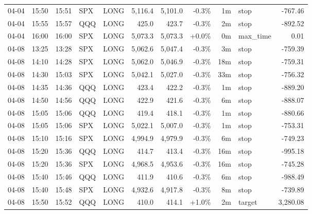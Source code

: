 \documentclass[11pt,a4paper,twoside]{article}
\begin{document}
\begin{center}
\begin{longtable}{>{\color{txtmain}}l l l l l r r r r >{\color{txtmain}}l r}
04-04 & 15:50 & 15:51 & SPX & LONG & 5,116.4 & 5,101.0 & \textcolor{lossred}{-0.3\%} & 1m & stop & \textcolor{lossred}{-767.46} \\
04-04 & 15:55 & 15:57 & QQQ & LONG & 425.0 & 423.7 & \textcolor{lossred}{-0.3\%} & 2m & stop & \textcolor{lossred}{-892.52} \\
04-04 & 16:00 & 16:00 & SPX & LONG & 5,073.3 & 5,073.3 & \textcolor{wingreen}{+0.0\%} & 0m & max\_time & \textcolor{wingreen}{0.01} \\
04-08 & 13:25 & 13:28 & SPX & LONG & 5,062.6 & 5,047.4 & \textcolor{lossred}{-0.3\%} & 3m & stop & \textcolor{lossred}{-759.39} \\
04-08 & 14:10 & 14:28 & SPX & LONG & 5,062.0 & 5,046.9 & \textcolor{lossred}{-0.3\%} & 18m & stop & \textcolor{lossred}{-759.31} \\
04-08 & 14:30 & 15:03 & SPX & LONG & 5,042.1 & 5,027.0 & \textcolor{lossred}{-0.3\%} & 33m & stop & \textcolor{lossred}{-756.32} \\
04-08 & 14:35 & 14:36 & QQQ & LONG & 423.4 & 422.2 & \textcolor{lossred}{-0.3\%} & 1m & stop & \textcolor{lossred}{-889.20} \\
04-08 & 14:50 & 14:56 & QQQ & LONG & 422.9 & 421.6 & \textcolor{lossred}{-0.3\%} & 6m & stop & \textcolor{lossred}{-888.07} \\
04-08 & 15:05 & 15:06 & QQQ & LONG & 419.4 & 418.1 & \textcolor{lossred}{-0.3\%} & 1m & stop & \textcolor{lossred}{-880.66} \\
04-08 & 15:05 & 15:06 & SPX & LONG & 5,022.1 & 5,007.0 & \textcolor{lossred}{-0.3\%} & 1m & stop & \textcolor{lossred}{-753.31} \\
04-08 & 15:10 & 15:16 & SPX & LONG & 4,994.9 & 4,979.9 & \textcolor{lossred}{-0.3\%} & 6m & stop & \textcolor{lossred}{-749.23} \\
04-08 & 15:20 & 15:36 & QQQ & LONG & 414.7 & 413.4 & \textcolor{lossred}{-0.3\%} & 16m & stop & \textcolor{lossred}{-995.18} \\
04-08 & 15:20 & 15:36 & SPX & LONG & 4,968.5 & 4,953.6 & \textcolor{lossred}{-0.3\%} & 16m & stop & \textcolor{lossred}{-745.28} \\
04-08 & 15:40 & 15:46 & QQQ & LONG & 411.9 & 410.6 & \textcolor{lossred}{-0.3\%} & 6m & stop & \textcolor{lossred}{-988.49} \\
04-08 & 15:40 & 15:48 & SPX & LONG & 4,932.6 & 4,917.8 & \textcolor{lossred}{-0.3\%} & 8m & stop & \textcolor{lossred}{-739.89} \\
04-08 & 15:50 & 15:52 & QQQ & LONG & 410.0 & 414.1 & \textcolor{wingreen}{+1.0\%} & 2m & target & \textcolor{wingreen}{3,280.08} \\

\end{longtable}
\end{center}
\end{document}
